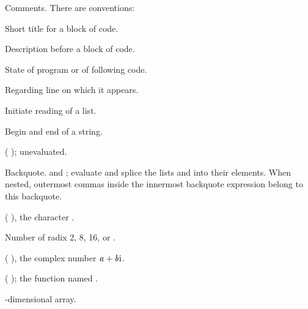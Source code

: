 \begin{LIST}{1cm}

  {
  Comments. There are conventions:
  }
  \begin{LIST}{.5cm}
    {Short title for a block of code.}

    {Description before a block of code.}

    {State of program or of following code.}

    {Regarding line on which it appears.}

  \end{LIST}

  \IT{\KWD*{(}\qquad\quad}
  {
  Initiate reading of a list.
  }

  {
  Begin and end of a string.
  }

  {
  ( );  unevaluated.
  }

  {
  Backquote.   and ; evaluate 
  and splice the lists  and  into their
  elements. When nested, outermost commas inside the innermost
  backquote expression belong to this backquote.
  }

  {
  ( ), the character .
  }

  {
  Number of radix 2, 8, 16, or . 
  }

  {
    (  ), the complex number $\VAR{a}+\VAR{b}\text{i}$.
  }

  {
  ( ); the function named .
  }

  {
  -dimensional array.
  }


\end{LIST}
